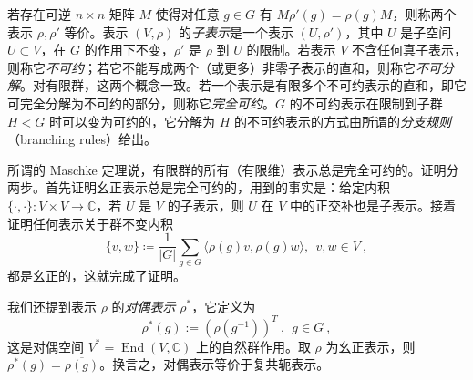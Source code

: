 \documentclass[11pt,a4paper,fontset=windows]{ctexart}
\numberwithin{equation}{section}
\newcommand{\End}{\operatorname{\text{End}}}      %
\newcommand{\CC}{\mathbb{C}}
\def\rr{\rho}
\begin{document}

若存在可逆 $n\times n$ 矩阵 $M$ 使得对任意 $g\in G$ 有 $M\rr'(g)=\rr(g)M$，则称两个表示 $\rr,\rr'$ 等价。表示 $(V,\rr)$ 的\emph{子表示}是一个表示 $(U,\rr')$，其中 $U$ 是子空间 $U\subset V$，在 $G$ 的作用下不变，$\rr'$ 是 $\rr$ 到 $U$ 的限制。若表示 $V$ 不含任何真子表示，则称它\emph{不可约}；若它不能写成两个（或更多）非零子表示的直和，则称它\emph{不可分解}。对有限群，这两个概念一致。若一个表示是有限多个不可约表示的直和，即它可完全分解为不可约的部分，则称它\emph{完全可约}。$G$ 的不可约表示在限制到子群 $H<G$ 时可以变为可约的，它分解为 $H$ 的不可约表示的方式由所谓的\emph{分支规则}（branching rules）给出。

所谓的 Maschke 定理说，有限群的所有（有限维）表示总是完全可约的。证明分两步。首先证明幺正表示总是完全可约的，用到的事实是：给定内积 $\lbrace\cdot,\cdot\rbrace: V\times V \to \CC$，若 $U$ 是 $V$ 的子表示，则 $U$ 在 $V$ 中的正交补也是子表示。接着证明任何表示关于群不变内积
\begin{equation}
\lbrace v,w\rbrace\coloneqq\frac{1}{| G|}\sum_{g\in G}\langle\rr(g)v,\rr(g)w\rangle,~~v,w\in V~,
\end{equation}
都是幺正的，这就完成了证明。


我们还提到表示 $\rr$ 的\emph{对偶表示} $\rr^*$，它定义为
\begin{equation}
\label{eq:dual_rep}
\rr^*(g):=\left(\rr\left(g^{-1}\right)\right)^T~,~~g\in G~, 
\end{equation}
这是对偶空间 $V^*=\End(V,\CC)$ 上的自然群作用。取 $\rho$ 为幺正表示，则 $\rho^*(g)=\overline{\rho(g)}$。换言之，对偶表示等价于复共轭表示。
\end{document}
